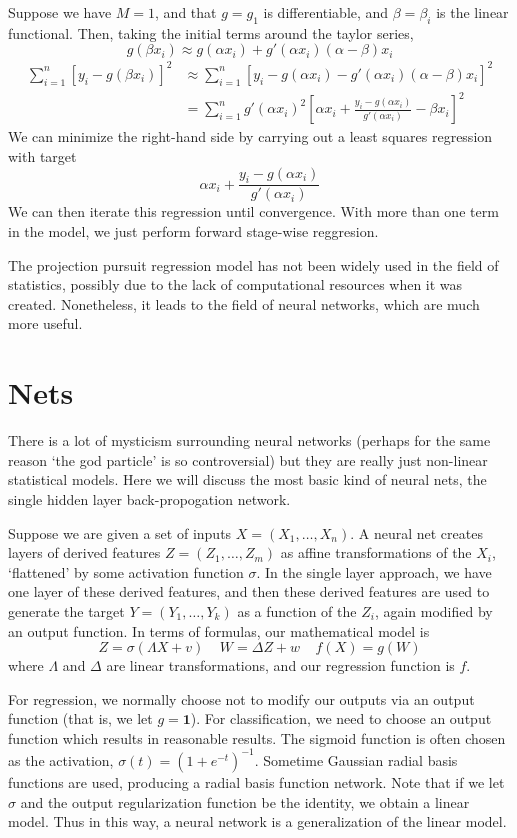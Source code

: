 Suppose we have $M = 1$, and that $g = g_1$ is differentiable, and $\beta = \beta_i$ is the linear functional. Then, taking the initial terms around the taylor series,
%
\[ g(\beta x_i) \approx g(\alpha x_i) + g'(\alpha x_i) (\alpha - \beta)x_i \]
%
\begin{align*}
    \sum_{i = 1}^n [y_i - g(\beta x_i)]^2 &\approx \sum_{i = 1}^n [y_i - g(\alpha x_i) - g'(\alpha x_i)(\alpha - \beta)x_i]^2\\
    &= \sum_{i = 1}^n g'(\alpha x_i)^2 \left[ \alpha x_i +  \frac{y_i - g(\alpha x_i)}{g'(\alpha x_i)} - \beta x_i \right]^2
\end{align*}
%
We can minimize the right-hand side by carrying out a least squares regression with target
%
\[ \alpha x_i + \frac{y_i - g(\alpha x_i)}{g'(\alpha x_i)} \]
%
We can then iterate this regression until convergence. With more than one term in the model, we just perform forward stage-wise reggresion.

The projection pursuit regression model has not been widely used in the field of statistics, possibly due to the lack of computational resources when it was created. Nonetheless, it leads to the field of neural networks, which are much more useful.

\section{Nets}

There is a lot of mysticism surrounding neural networks (perhaps for the same reason `the god particle' is so controversial) but they are really just non-linear statistical models. Here we will discuss the most basic kind of neural nets, the single hidden layer back-propogation network.

Suppose we are given a set of inputs $X = (X_1, \dots, X_n)$. A neural net creates layers of derived features $Z = (Z_1, \dots, Z_m)$ as affine transformations of the $X_i$, `flattened' by some activation function $\sigma$. In the single layer approach, we have one layer of these derived features, and then these derived features are used to generate the target $Y = (Y_1, \dots, Y_k)$ as a function of the $Z_i$, again modified by an output function. In terms of formulas, our mathematical model is
%
\[ Z = \sigma(\Lambda X + v)\ \ \ \ \ W = \Delta Z + w\ \ \ \ \ f(X) = g(W) \]
%
where $\Lambda$ and $\Delta$ are linear transformations, and our regression function is $f$.

For regression, we normally choose not to modify our outputs via an output function (that is, we let $g = \mathbf{1}$). For classification, we need to choose an output function which results in reasonable results. The sigmoid function is often chosen as the activation, $\sigma(t) = (1 + e^{-t})^{-1}$. Sometime Gaussian radial basis functions are used, producing a radial basis function network. Note that if we let $\sigma$ and the output regularization function be the identity, we obtain a linear model. Thus in this way, a neural network is a generalization of the linear model.


